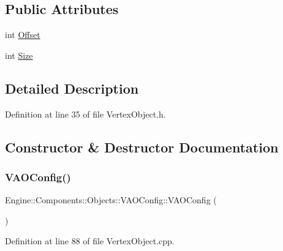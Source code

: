 \subsection*{Public Attributes}
\begin{DoxyCompactItemize}
\item 
int \mbox{\hyperlink{structEngine_1_1Components_1_1Objects_1_1VAOConfig_a6060677b7de418e6f1143a76ddd5ac98}{Offset}}
\item 
int \mbox{\hyperlink{structEngine_1_1Components_1_1Objects_1_1VAOConfig_a1591984c2db527f1e17d8965039b9d9c}{Size}}
\end{DoxyCompactItemize}


\subsection{Detailed Description}


Definition at line 35 of file Vertex\+Object.\+h.



\subsection{Constructor \& Destructor Documentation}
\mbox{\label{structEngine_1_1Components_1_1Objects_1_1VAOConfig_af0fc55d3a998fd288ef8d5ddb2c808c8}} 
\subsubsection{\texorpdfstring{V\+A\+O\+Config()}{VAOConfig()}\hspace{0.1cm}{\footnotesize\ttfamily [1/2]}}
{\footnotesize\ttfamily Engine\+::\+Components\+::\+Objects\+::\+V\+A\+O\+Config\+::\+V\+A\+O\+Config (\begin{DoxyParamCaption}{ }\end{DoxyParamCaption})}



Definition at line 88 of file Vertex\+Object.\+cpp.


